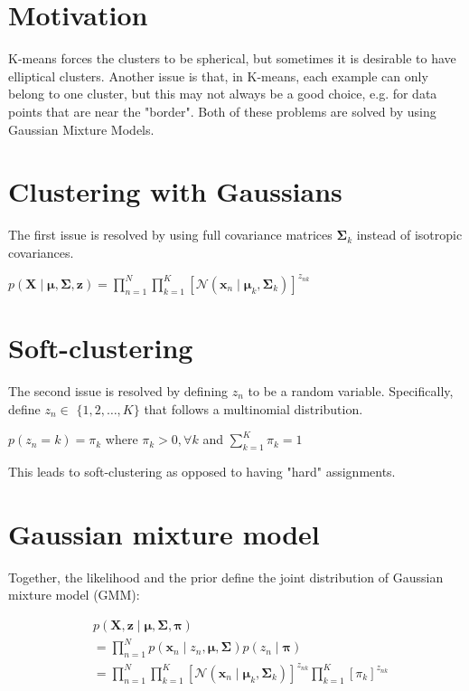 
\section*{Motivation}
K-means forces the clusters to be spherical, but sometimes it is desirable to have elliptical clusters. Another issue is that, in K-means, each example can only belong to one cluster, but this may not always be a good choice, e.g. for data points that are near the "border". Both of these problems are solved by using Gaussian Mixture Models.

\section*{Clustering with Gaussians}
The first issue is resolved by using full covariance matrices $\boldsymbol{\Sigma}_{k}$ instead of isotropic covariances.

$p(\mathbf{X} \mid \boldsymbol{\mu}, \boldsymbol{\Sigma}, \mathbf{z})=\prod_{n=1}^{N} \prod_{k=1}^{K}\left[\mathcal{N}\left(\mathbf{x}_{n} \mid \boldsymbol{\mu}_{k}, \boldsymbol{\Sigma}_{k}\right)\right]^{z_{n k}}$

\section*{Soft-clustering}
The second issue is resolved by defining $z_{n}$ to be a random variable. Specifically, define $z_{n} \in$ $\{1,2, \ldots, K\}$ that follows a multinomial distribution.

$p\left(z_{n}=k\right)=\pi_{k}$ where $\pi_{k}>0, \forall k$ and $\sum_{k=1}^{K} \pi_{k}=1$

This leads to soft-clustering as opposed to having "hard" assignments.



\section*{Gaussian mixture model}
Together, the likelihood and the prior define the joint distribution of Gaussian mixture model (GMM):

$$
\begin{aligned}
& p(\mathbf{X}, \mathbf{z} \mid \boldsymbol{\mu}, \boldsymbol{\Sigma}, \boldsymbol{\pi}) \\
& =\prod_{n=1}^{N} p\left(\mathbf{x}_{n} \mid z_{n}, \boldsymbol{\mu}, \boldsymbol{\Sigma}\right) p\left(z_{n} \mid \boldsymbol{\pi}\right) \\
& =\prod_{n=1}^{N} \prod_{k=1}^{K}\left[\mathcal{N}\left(\mathbf{x}_{n} \mid \boldsymbol{\mu}_{k}, \boldsymbol{\Sigma}_{k}\right)\right]^{z_{n k}} \prod_{k=1}^{K}\left[\pi_{k}\right]^{z_{n k}}
\end{aligned}
$$

